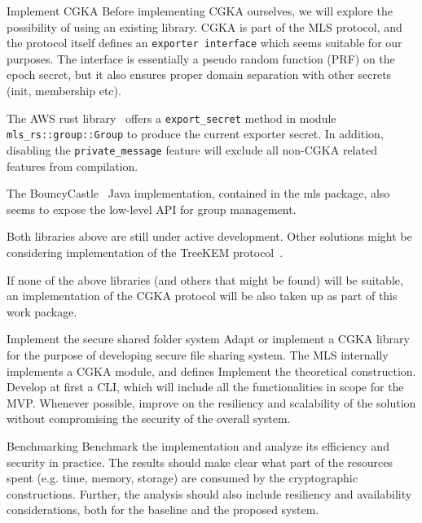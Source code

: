 \documentclass[E]{BAMASA}
\begin{document}
\begin{workpackage}{Implement CGKA}\label{wp:impl-cgka}
    Before implementing CGKA ourselves, we will explore the possibility of using an existing library.
    CGKA is part of the MLS protocol, and the protocol itself defines an \texttt{exporter interface} which
    seems suitable for our purposes. 
    The interface is essentially a pseudo random function (PRF) on the epoch secret, but it also ensures 
    proper domain separation with other secrets (init, membership etc).

    The AWS rust library~\cite{AWSMLSrs} offers a \texttt{export\_secret} method in module 
    \texttt{mls\_rs::group::Group} to produce the current exporter secret. In addition, disabling the \texttt{private\_message} feature 
    will exclude all non-CGKA related features from compilation.

    The BouncyCastle~\cite{BouncyCastle} Java implementation, contained in the mls package, also seems to expose the
    low-level API for group management.

    Both libraries above are still under active development. Other solutions might be considering
    implementation of the TreeKEM protocol~\cite{TreeKEMimpl}.

    If none of the above libraries (and others that might be found) will be suitable, an implementation of
    the CGKA protocol will be also taken up as part of this work package.
    

\end{workpackage}

\begin{workpackage}{Implement the secure shared folder system}\label{wp:impl-ssf}
    Adapt or implement a CGKA library for the purpose of developing secure file sharing system. The MLS internally implements a CGKA module, and defines  
	Implement the theoretical construction. Develop at first a CLI, which will include all the functionalities in scope for the MVP. Whenever possible, improve on the resiliency and scalability of the solution without compromising the security of the overall system.
\end{workpackage}

\begin{workpackage}{Benchmarking}\label{wp:benchmark}
	Benchmark the implementation and analyze its efficiency and security in practice. The results should make clear what part of the resources spent (e.g. time, memory, storage) are consumed by the cryptographic constructions. Further, the analysis should also include resiliency and availability considerations, both for the baseline and the proposed system.  
\end{workpackage}
\end{document}
